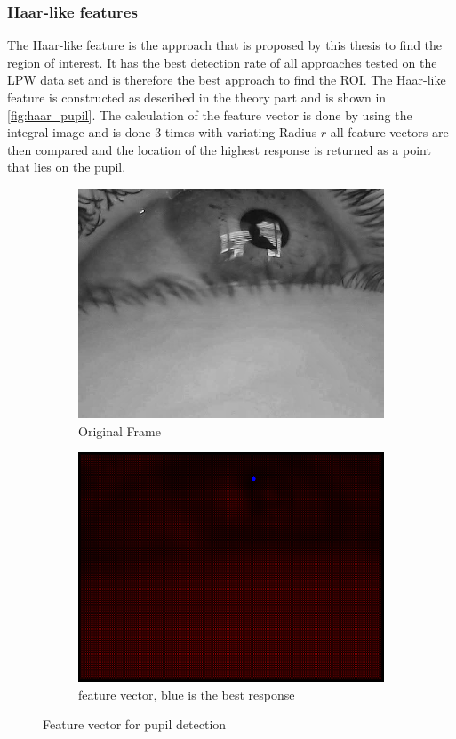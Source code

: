 \subsubsection{Haar-like features}
The Haar-like feature is the approach that is proposed by this thesis to find the region of interest. It has the best detection rate of all approaches tested on the LPW data set and is therefore the best approach to find the ROI. The Haar-like feature is constructed as described in the theory part and is shown in \ref{fig:haar_pupil}. 
The calculation of the feature vector is done by using the integral image and is done 3 times with variating Radius $r$ all feature vectors are then compared and the location of the highest response is returned as a point that lies on the pupil. 

\begin{figure}[h]
    \centering
    \begin{subfigure}{0.5\textwidth}
        \centering
        \includegraphics[width=0.9\linewidth]{plots/results/originalbest.png}
        \caption{Original Frame}
    \end{subfigure}%
    \hfill
    \begin{subfigure}{0.5\textwidth}
        \centering
        \includegraphics[width=0.9\linewidth]{plots/results/responsehaarbest.png}
        \caption{feature vector, blue is the best response}
    \end{subfigure}%
 
    \caption{Feature vector for pupil detection}
    \label{fig:limit_haar}
\end{figure}

